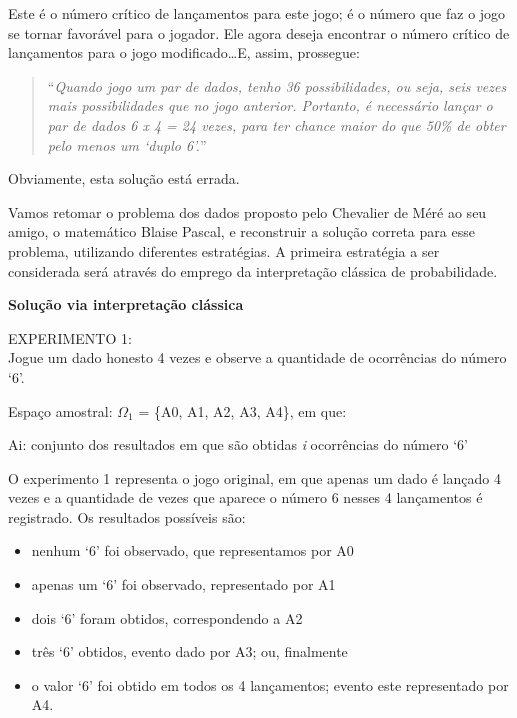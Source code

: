 \documentclass[
]{book}
\providecommand{\tightlist}{%
  \setlength{\itemsep}{0pt}\setlength{\parskip}{0pt}}
\theoremstyle{definition}
\theoremstyle{definition}
\theoremstyle{definition}
\theoremstyle{remark}
\begin{document}
Este é o número crítico de lançamentos para este jogo; é o número que faz o jogo se tornar favorável para o jogador. Ele agora deseja encontrar o número crítico de lançamentos para o jogo modificado\ldots E, assim, prossegue:

\begin{quote}
``\emph{Quando jogo um par de dados, tenho 36 possibilidades, ou seja, seis vezes mais possibilidades que no jogo anterior. Portanto, é necessário lançar o par de dados 6 x 4 = 24 vezes, para ter chance maior do que 50\% de obter pelo menos um `duplo 6'.}''
\end{quote}

Obviamente, esta solução está errada.

Vamos retomar o problema dos dados proposto pelo Chevalier de Méré ao seu amigo, o matemático Blaise Pascal, e reconstruir a solução correta para esse problema, utilizando diferentes estratégias. A primeira estratégia a ser considerada será através do emprego da interpretação clássica de probabilidade.

\textbf{Solução via interpretação clássica}

EXPERIMENTO 1:\\
Jogue um dado honesto 4 vezes e observe a quantidade de ocorrências do número `6'.

Espaço amostral: \(\Omega_1\) = \{A0, A1, A2, A3, A4\}, em que:

Ai: conjunto dos resultados em que são obtidas \emph{i} ocorrências do número `6'

O experimento 1 representa o jogo original, em que apenas um dado é lançado 4 vezes e a quantidade de vezes que aparece o número 6 nesses 4 lançamentos é registrado. Os resultados possíveis são:

\begin{itemize}
\tightlist
\item
  nenhum `6' foi observado, que representamos por A0\\
\item
  apenas um `6' foi observado, representado por A1\\
\item
  dois `6' foram obtidos, correspondendo a A2\\
\item
  três `6' obtidos, evento dado por A3; ou, finalmente\\
\item
  o valor `6' foi obtido em todos os 4 lançamentos; evento este representado por A4.
\end{itemize}
\end{document}
